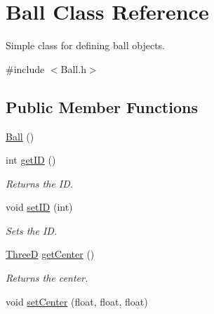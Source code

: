 \hypertarget{class_ball}{\section{Ball Class Reference}
\label{class_ball}
}


Simple class for defining ball objects.  




{\ttfamily \#include $<$Ball.\-h$>$}

\subsection*{Public Member Functions}
\begin{DoxyCompactItemize}
\item 
\hyperlink{class_ball_a86a144d3dad6c953e422e32435923bbb}{Ball} ()
\item 
\hypertarget{class_ball_a046889da002ccfe01be6f242bd1ee4e5}{int \hyperlink{class_ball_a046889da002ccfe01be6f242bd1ee4e5}{get\-I\-D} ()}\label{class_ball_a046889da002ccfe01be6f242bd1ee4e5}

\begin{DoxyCompactList}\small\item\em Returns the I\-D. \end{DoxyCompactList}\item 
\hypertarget{class_ball_a8d66543d91326dbad6877a394273b244}{void \hyperlink{class_ball_a8d66543d91326dbad6877a394273b244}{set\-I\-D} (int)}\label{class_ball_a8d66543d91326dbad6877a394273b244}

\begin{DoxyCompactList}\small\item\em Sets the I\-D. \end{DoxyCompactList}\item 
\hypertarget{class_ball_ac13b628f8760d011ccc6e95eb18014ac}{\hyperlink{global_8h_a62cc051caefbc94bc22d587ea537d9e8}{Three\-D} \hyperlink{class_ball_ac13b628f8760d011ccc6e95eb18014ac}{get\-Center} ()}\label{class_ball_ac13b628f8760d011ccc6e95eb18014ac}

\begin{DoxyCompactList}\small\item\em Returns the center. \end{DoxyCompactList}\item 
\hypertarget{class_ball_a21ac3483e3c264248875d65955faf597}{void \hyperlink{class_ball_a21ac3483e3c264248875d65955faf597}{set\-Center} (float, float, float)}\label{class_ball_a21ac3483e3c264248875d65955faf597}


\end{DoxyCompactItemize}
